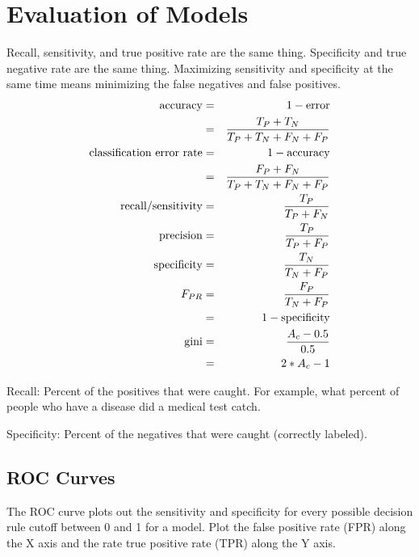 	\section{Evaluation of Models}
Recall, sensitivity, and true positive rate are the same thing.  Specificity and true negative rate are the same thing.  Maximizing sensitivity and specificity at the same time means minimizing the false negatives and false positives.
	\begin{eqnarray}
		\textrm{accuracy} 						& = & 1 - \textrm{error} 						\\
												& = & \frac{T_P + T_N}{T_P + T_N + F_N + F_P} 	\\
		\textrm{classification error  rate}		& = & 1 - \textrm{accuracy} 					\\
												& = & \frac{F_P + F_N}{T_P + T_N + F_N + F_P} 	\\
		\textrm{recall/sensitivity}				& = & \frac{T_P}{T_P + F_N} 					\\
		\textrm{precision} 						& = & \frac{T_P}{T_P + F_P} 					\\
		\textrm{specificity} 					& = & \frac{T_N}{T_N + F_P}						\\
		\mbox{$F_{PR}$}						& = & \frac{F_P}{T_N + F_P}						\\
												& = & 1 - \textrm{specificity}					\\
		\textrm{gini}							& = & \frac{A_c - 0.5}{0.5}						\\
												& = & 2*A_c - 1
	\end{eqnarray}
	\begin{mathwhere}[0.4in]
	\end{mathwhere}

Recall: Percent of the positives that were caught.  For example, what percent of people who have a disease did a medical test catch.

Specificity: Percent of the negatives that were caught (correctly labeled).

	\subsection{ROC Curves}
The ROC curve plots out the sensitivity and specificity for every possible decision rule cutoff between 0 and 1 for a model.
Plot the false positive rate (FPR) along the X axis and the rate true positive rate (TPR) along the Y axis. 